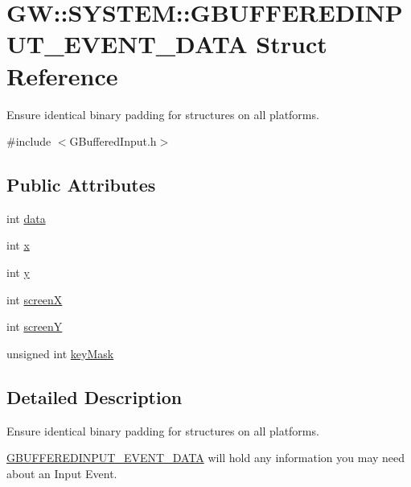 \hypertarget{structGW_1_1SYSTEM_1_1GBUFFEREDINPUT__EVENT__DATA}{}\section{GW\+::S\+Y\+S\+T\+EM\+::G\+B\+U\+F\+F\+E\+R\+E\+D\+I\+N\+P\+U\+T\+\_\+\+E\+V\+E\+N\+T\+\_\+\+D\+A\+TA Struct Reference}
\label{structGW_1_1SYSTEM_1_1GBUFFEREDINPUT__EVENT__DATA}


Ensure identical binary padding for structures on all platforms.  




{\ttfamily \#include $<$G\+Buffered\+Input.\+h$>$}

\subsection*{Public Attributes}
\begin{DoxyCompactItemize}
\item 
int \mbox{\hyperlink{structGW_1_1SYSTEM_1_1GBUFFEREDINPUT__EVENT__DATA_abe62d14dd92dc136e8ab4f53ee26d794}{data}}
\item 
int \mbox{\hyperlink{structGW_1_1SYSTEM_1_1GBUFFEREDINPUT__EVENT__DATA_a055e18b0d2aa3135ca8237bb06a0b4cb}{x}}
\item 
int \mbox{\hyperlink{structGW_1_1SYSTEM_1_1GBUFFEREDINPUT__EVENT__DATA_a68facd2e2754c908ecf8b8ef4ce34e08}{y}}
\item 
int \mbox{\hyperlink{structGW_1_1SYSTEM_1_1GBUFFEREDINPUT__EVENT__DATA_a8c87335f76992eddba30abe7312b5b43}{screenX}}
\item 
int \mbox{\hyperlink{structGW_1_1SYSTEM_1_1GBUFFEREDINPUT__EVENT__DATA_a066fa9b2dc654907d13590612238354d}{screenY}}
\item 
unsigned int \mbox{\hyperlink{structGW_1_1SYSTEM_1_1GBUFFEREDINPUT__EVENT__DATA_a7a818ba319e6693b89099938368a699e}{key\+Mask}}
\end{DoxyCompactItemize}


\subsection{Detailed Description}
Ensure identical binary padding for structures on all platforms. 

\mbox{\hyperlink{structGW_1_1SYSTEM_1_1GBUFFEREDINPUT__EVENT__DATA}{G\+B\+U\+F\+F\+E\+R\+E\+D\+I\+N\+P\+U\+T\+\_\+\+E\+V\+E\+N\+T\+\_\+\+D\+A\+TA}} will hold any information you may need about an Input Event. 

